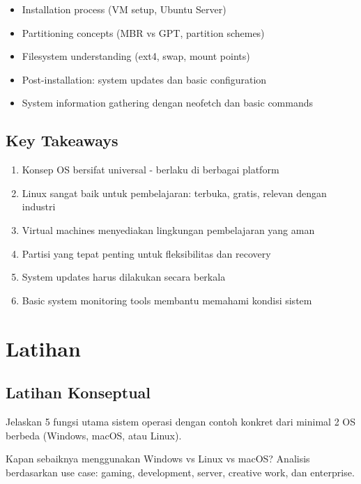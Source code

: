 \begin{itemize}
    \item Installation process (VM setup, Ubuntu Server)
    \item Partitioning concepts (MBR vs GPT, partition schemes)
    \item Filesystem understanding (ext4, swap, mount points)
    \item Post-installation: system updates dan basic configuration
    \item System information gathering dengan neofetch dan basic commands
\end{itemize}

\subsection{Key Takeaways}

\begin{enumerate}
    \item Konsep OS bersifat universal - berlaku di berbagai platform
    \item Linux sangat baik untuk pembelajaran: terbuka, gratis, relevan dengan industri
    \item Virtual machines menyediakan lingkungan pembelajaran yang aman
    \item Partisi yang tepat penting untuk fleksibilitas dan recovery
    \item System updates harus dilakukan secara berkala
    \item Basic system monitoring tools membantu memahami kondisi sistem
\end{enumerate}

\section{Latihan}
\label{sec:exercises}

\subsection{Latihan Konseptual}

\begin{exercisebox}[1.1]
Jelaskan 5 fungsi utama sistem operasi dengan contoh konkret dari minimal 2 OS berbeda (Windows, macOS, atau Linux).
\end{exercisebox}

\begin{exercisebox}[1.2]
Kapan sebaiknya menggunakan Windows vs Linux vs macOS? Analisis berdasarkan use case: gaming, development, server, creative work, dan enterprise.
\end{exercisebox}

